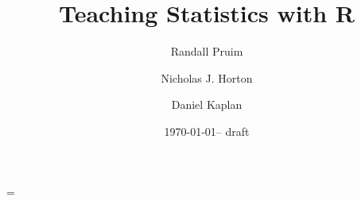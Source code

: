 \documentclass[twoside]{report}
\newcommand{\hlcomment}[1]{\textcolor[rgb]{.18,.6,.34}{#1}}%
\begin{document}
\title{Teaching Statistics with R}

\author{
Randall Pruim
\and
Nicholas J. Horton 
\and 
Daniel Kaplan 
}

\date{\today -- draft}



\newif\ifhweave
\ifdef{\hlcomment}{\hweavetrue}{\hweavefalse}
\hweavefalse
\ifhweave
\renewenvironment{Hchunk}%
{%
\vspace{0.5em}\noindent\begin{lrbox}{\highlightbox}%
\begin{minipage}[b]{\Rwidth}%
}%
{%
\end{minipage}%
\end{lrbox}%
\fcolorbox{highlightBg}{highlightBg}{\usebox{\highlightbox}}%
\vspace{0.5em}}%

\renewcommand{\hlcomment}[1]{\textcolor[rgb]{0.4,0.4,0.3}{#1}}%
\fi
\Rwidth=\textwidth

\parindent=0pt
\parskip=3mm








\maketitle

\setcounter{tocdepth}{1}
\tableofcontents

\let\oldchapter=\chapter












\end{document}
